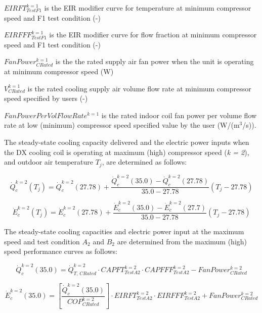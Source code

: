 \(EIRFT_{TestF1}^{k = 1}\) is the EIR modifier curve for temperature at minimum compressor speed and F1 test condition (-)

\(EIRFFF_{TestF1}^{k = 1}\) is the EIR modifier curve for flow fraction at minimum compressor speed and F1 test condition (-)

\(FanPower_{CRated}^{k = 1}\) is the the rated supply air fan power when the unit is operating at minimum compressor speed (W)

\(V_{CRated}^{k = 1}\) is the rated cooling supply air volume flow rate at minimum compressor speed specified by users (-)

\(FanPowerPerVolFlowRat{e^{k = 1}}\) is the rated indoor coil fan power per volume flow rate at low (minimum) compressor speed specified value by the user (W/(m\(^3\)/s)).

The steady-state cooling capacity delivered and the electric power inputs when the DX cooling coil is operating at maximum (high) compressor speed (\emph{k = 2}), and outdoor air temperature \(T_{j}\), are determined as follows:

\begin{equation}
\dot Q_c^{k = 2}({T_j}) = \dot Q_c^{k = 2}(27.78) + \frac{{\dot Q_c^{k = 2}(35.0) - \dot Q_c^{k = 2}(27.78)}}{{35.0 - 27.78}}\left( {{T_j} - 27.78} \right)
\end{equation}

\begin{equation}
\dot E_c^{k = 2}({T_j}) = \dot E_c^{k = 2}(27.78) + \frac{{\dot E_c^{k = 2}(35.0) - \dot E_c^{k = 2}(27.7)}}{{35.0 - 27.78}}\left( {{T_j} - 27.78} \right)
\end{equation}

The steady-state cooling capacities and electric power input at the maximum speed and test condition \(A_{2}\) and \(B_{2}\) are determined from the maximum (high) speed performance curves as follows:

\begin{equation}
\dot Q_c^{k = 2}(35.0) = \dot Q_{T,\,CRated}^{k = 2} \cdot CAPFT_{TestA2}^{k = 2} \cdot CAPFFF_{TestA2}^{k = 2} - FanPower_{CRated}^{k = 2}
\end{equation}

\begin{equation}
\dot E_c^{k = 2}(35.0) = \left[ {\frac{{\dot Q_c^{k = 2}(35.0)}}{{COP_{CRated}^{k = 2}}}} \right] \cdot EIRFT_{TestA2}^{k = 2} \cdot EIRFFF_{TestA2}^{k = 2} + FanPower_{CRated}^{k = 2}
\end{equation}

